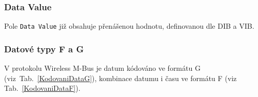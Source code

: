 
\subsubsection{Data Value}
Pole \texttt{Data Value} již obsahuje přenášenou hodnotu, definovanou dle DIB a VIB.


\subsubsection{Datové typy F a G}
V protokolu Wireless M-Bus je datum kódováno ve formátu G (viz~Tab.~\ref{KodovaniDataG}), kombinace datumu i času ve formátu F (viz Tab.~\ref{KodovaniDataF}).

